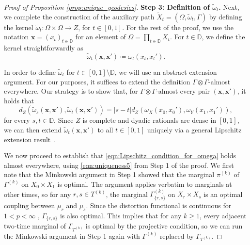 \documentclass{article}
\theoremstyle{definition}
\begin{document}
\begin{proof}[Proof of Proposition \ref{prop:unique_geodesics}]
%

%
%
%
%
%
%
%
%
%
%
%

%
%
%
%
%
%
%
%
%
%
%
%
%
%
%
%
%
%
%
%
%
%
%

    \smallskip
    \noindent \textbf{Step 3: Definition of  $\tilde{\omega}_t$.} Next, we complete the construction of the auxiliary path $\widetilde{X}_t = (\Omega, \tilde{\omega}_t, \Gamma)$ by defining the kernel $\tilde{\omega}_t: \Omega \times \Omega \to Z$, for $t \in [0,1]$. For the rest of the proof, we use the notation $\mathbf{x} = (x_t)_{t \in \mathbb{D}}$ for an element of $\Omega = \prod_{t \in \mathbb{D}} X_t$. For $t\in \mathbb{D}$, we define the kernel straightforwardly as 
    \begin{equation}
    \tilde{\omega}_t(\mathbf{x},\mathbf{x}')\coloneqq \omega_t(x_t,x_t').
    \end{equation}
    
    In order to define $\tilde{\omega}_t$ for $t \in [0,1] \setminus \mathbb{D}$, we will use an abstract extension argument. For our purposes, it suffices to extend the definition $\Gamma \otimes \Gamma$-almost everywhere. Our strategy is to show that, for $\Gamma \otimes \Gamma$-almost every pair $(\mathbf{x},\mathbf{x}')$, it holds that 
    \begin{equation}\label{eqn:Lipschitz_condition_for_omega}
       d_Z(\tilde{\omega}_{s}(\mathbf{x},\mathbf{x}'), \tilde{\omega}_{t}(\mathbf{x},\mathbf{x}')) = |s-t|d_Z(\omega_X(x_0, x_0'), \omega_Y(x_1, x_1')),
    \end{equation}
    for every $s,t \in \mathbb{D}$. 
    Since $Z$ is complete and dyadic rationals are dense in $[0,1]$, we can then  extend $\tilde{\omega}_{t}(\mathbf{x},\mathbf{x}')$ to all $t\in [0,1]$ uniquely via a general Lipschitz extension result~\cite[Proposition 1.5.9]{BBI2001}. 
    
    We now proceed to establish that \eqref{eqn:Lipschitz_condition_for_omega} holds almost everywhere, using \eqref{eqn:uniqueness5} from Step 1 of the proof. We first note that the Minkowski argument in Step 1 showed that the marginal $\pi^{(k)}$ of $\Gamma^{(k)}$ on $X_0\times X_1$ is optimal. The argument applies verbatim to marginals at other times, so for any $r,s\in T^{(k)}$, the marginal $\Gamma_{\{r,s\}}^{(k)}$ on $X_r\times X_s$ is an optimal coupling between $\mu_r$ and $\mu_s$. Since the distortion functional is continuous for $1<p<\infty$ \cite[Lemma 27 and Proof of Theorem 26]{bauer2025zgromovwassersteindistance}, $\Gamma_{\{r,s\}}$ is also optimal. This implies that for any $k\geq 1$, every adjacent two-time marginal of  $\Gamma_{T^{(k)}}$ is optimal by the projective condition, so we can run the Minkowski argument in Step 1 again with $\Gamma^{(k)}$ replaced by $\Gamma_{T^{(k)}}$.
    


\end{proof}
\end{document}
